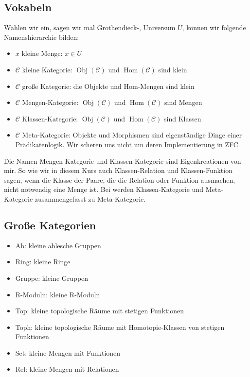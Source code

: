 \documentclass[a4paper]{amsart}
\theoremstyle{definition}
\DeclareMathOperator{\Hom}{Hom}
\newcommand{\CC}{\ensuremath{\mathcal{ C }}}
\begin{document}
\subsection{Vokabeln}
Wählen wir ein, sagen wir mal Grothendieck-, Universum $U$, können wir folgende Namenshierarchie bilden:
\begin{itemize}
   \item $x$ kleine Menge: $x \in U$
   \item $\CC$ kleine Kategorie: $\operatorname{Obj}(\CC)$ und $\Hom(\CC)$ sind klein
   \item $\CC$ große Kategorie: die Objekte und Hom-Mengen sind klein
   \item $\CC$ Mengen-Kategorie: $\operatorname{Obj}(\CC)$ und $\Hom(\CC)$ sind Mengen 
   \item $\CC$ Klassen-Kategorie: $\operatorname{Obj}(\CC)$ und $\Hom(\CC)$ sind Klassen
   \item $\CC$ Meta-Kategorie: Objekte und Morphismen sind eigenständige Dinge einer Prädikatenlogik. Wir scheren uns nicht um deren Implementierung in ZFC
\end{itemize}
Die Namen Mengen-Kategorie und Klassen-Kategorie sind Eigenkreationen von mir. So wie wir in diesem Kurs auch Klassen-Relation und Klassen-Funktion sagen, wenn die Klasse der Paare, die die Relation oder Funktion ausmachen, nicht notwendig eine Menge ist. Bei \cite{MacLane} werden Klassen-Kategorie und Meta-Kategorie zusammengefasst zu Meta-Kategorie.

\subsection{Große Kategorien}
\begin{itemize}
   \item Ab: kleine ablesche Gruppen
   \item Ring: kleine Ringe 
   \item Gruppe: kleine Gruppen
   \item R-Moduln: kleine R-Moduln 
   \item Top: kleine topologische Räume mit stetigen Funktionen 
   \item Toph: kleine topologische Räume mit Homotopie-Klassen von stetigen Funktionen
   \item Set: kleine Mengen mit Funktionen
   \item Rel: kleine Mengen mit Relationen
\end{itemize}
\end{document}
